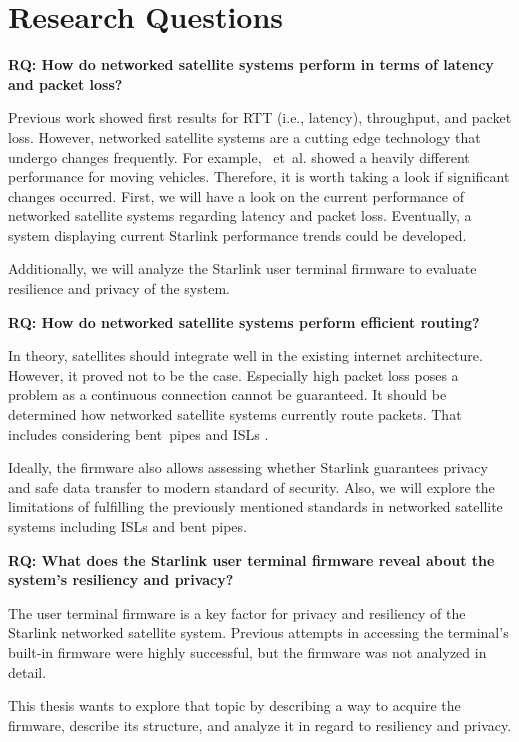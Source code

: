 \section{Research Questions} \label{sec:research-questions}

\begin{mdframed}
	\textbf{RQ: How do networked satellite systems perform in terms of latency and packet loss?}
\end{mdframed}

Previous work \cite{DBLP:conf/imc/MichelTGB22, DBLP:conf/infocom/MaCZCML23, Segan2020} showed first results for \ac{RTT} (i.e., latency), throughput, and packet loss. However, networked satellite systems are a cutting edge technology that undergo changes frequently. For example, \cite{DBLP:journals/corr/abs-2403-13497}~et~al. showed a heavily different performance for moving vehicles.
Therefore, it is worth taking a look if significant changes occurred. First, we will have a look on the current performance of networked satellite systems regarding latency and packet loss. Eventually, a system displaying current Starlink performance trends could be developed.

Additionally, we will analyze the Starlink user terminal firmware to evaluate resilience and privacy of the system.

\begin{mdframed}
	\textbf{RQ: How do networked satellite systems perform efficient routing?}
\end{mdframed}

In theory, satellites should integrate well in the existing internet architecture. However, it proved not to be the case. Especially high packet loss \cite{DBLP:conf/infocom/MaCZCML23} poses a problem as a continuous connection cannot be guaranteed.
It should be determined how networked satellite systems currently route packets. That includes considering bent~pipes and ISLs \cite{Hauri2020}.

Ideally, the firmware also allows assessing whether Starlink guarantees privacy and safe data transfer to modern standard of security.
Also, we will explore the limitations of fulfilling the previously mentioned standards in networked satellite systems including \ac{ISLs} and bent pipes.

\begin{mdframed}
	\textbf{RQ: What does the Starlink user terminal firmware reveal about the system's resiliency and privacy?}
\end{mdframed}

The user terminal firmware is a key factor for privacy and resiliency of the Starlink networked satellite system.
Previous attempts in accessing the terminal's built-in firmware were highly successful, but the firmware was not analyzed in detail. %

This thesis wants to explore that topic by describing a way to acquire the firmware, describe its structure, and analyze it in regard to resiliency and privacy.

